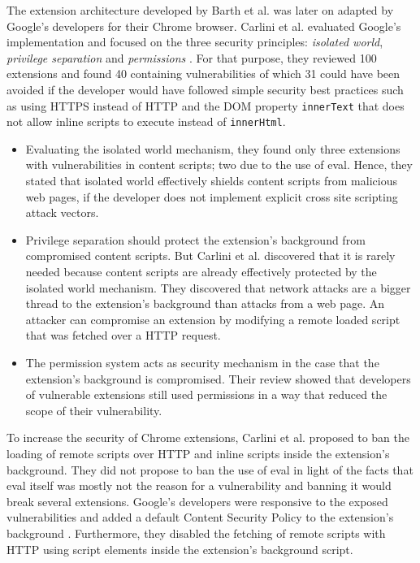 	
	The extension architecture developed by Barth et al. was later on adapted by Google's developers for their Chrome browser. Carlini et al. evaluated Google's implementation and focused on the three security principles: \textit{isolated world}, \textit{privilege separation} and \textit{permissions} \cite{Carlini:2012:EGC:2362793.2362800}. For that purpose, they reviewed 100 extensions and found 40 containing vulnerabilities of which 31 could have been avoided if the developer would have followed simple security best practices such as using HTTPS instead of HTTP and the DOM property \texttt{innerText} that does not allow inline scripts to execute instead of \texttt{innerHtml}. 
	
	\begin{itemize}
		\item Evaluating the isolated world mechanism, they found only three extensions with vulnerabilities in content scripts; two due to the use of eval. Hence, they stated that isolated world effectively shields content scripts from malicious web pages, if the developer does not implement explicit cross site scripting attack vectors.
		
		\item Privilege separation should protect the extension's background from compromised content scripts. But Carlini et al. discovered that it is rarely needed because content scripts are already effectively protected by the isolated world mechanism. They discovered that network attacks are a bigger thread to the extension's background than attacks from a web page. An attacker can compromise an extension by modifying a remote loaded script that was fetched over a HTTP request. 
		
		\item The permission system acts as security mechanism in the case that the extension's background is compromised. Their review showed that developers of vulnerable extensions still used permissions in a way that reduced the scope of their vulnerability. 
	\end{itemize} 

	To increase the security of Chrome extensions, Carlini et al. proposed to ban the loading of remote scripts over HTTP and inline scripts inside the extension's background. They did not propose to ban the use of eval in light of the facts that eval itself was mostly not the reason for a vulnerability and banning it would break several extensions. Google's developers were responsive to the exposed vulnerabilities and added a default Content Security Policy to the extension's background \cite{chromiumBlogCSP}. Furthermore, they disabled the fetching of remote scripts with HTTP using script elements inside the extension's background script. 
 
